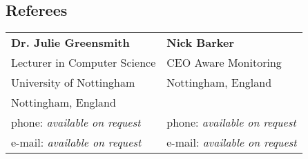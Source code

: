 \documentclass[margin,line]{resume}
\begin{document}
\begin{resume}



\section{\mysidestyle Referees} 

\begin{tabular}{@{}p{6cm}p{6cm}}
\textbf{Dr. Julie Greensmith}       &  \textbf{Nick Barker}                   \\
Lecturer in Computer Science			  &  CEO Aware Monitoring                       \\
University of Nottingham                &  Nottingham, England                      \\
Nottingham, England                     &          \\
phone: \textsl{available on request}    &  phone: \textsl{available on request}     \\
e-mail: \textsl{available on request}   &  e-mail: \textsl{available on request}    \\
\end{tabular}



\end{resume}
\end{document}
